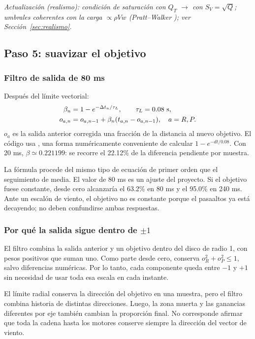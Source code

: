 \textit{Actualización (realismo): condición de saturación con $Q_T$ $\rightarrow$ con $S_V=\sqrt Q$; umbrales coherentes con la carga $\propto\rho Vw$ (Pratt--Walker \cite{pratt1954}); ver Sección~\ref{sec:realismo}.}

\subsection{Paso 5: suavizar el objetivo}
\subsubsection{Filtro de salida de 80 ms}
Después del límite vectorial:
\begin{align}
\beta_n&=1-e^{-\Delta t_n/\tau_L},\qquad \tau_L=0.08\ {\rm s},\\
o_{a,n}&=o_{a,n-1}+\beta_n(t_{a,n}-o_{a,n-1}),\quad a=R,P.
\label{eq:turb-lp}
\end{align}
$o_a$ es la salida anterior corregida una fracción de la distancia al nuevo objetivo. El código usa , una forma numéricamente conveniente de calcular $1-e^{-dt/0.08}$. Con 20 ms, $\beta\simeq0.221199$: se recorre el 22.12\% de la diferencia pendiente por muestra.

La fórmula procede del mismo tipo de ecuación de primer orden que el seguimiento de media. El valor de 80 ms es un ajuste del proyecto. Si el objetivo fuese constante, desde cero alcanzaría el 63.2\% en 80 ms y el 95.0\% en 240 ms. Ante un escalón de viento, el objetivo no es constante porque el pasaaltos ya está decayendo; no deben confundirse ambas respuestas.

\subsubsection{Por qué la salida sigue dentro de $\pm1$}
El filtro combina la salida anterior y un objetivo dentro del disco de radio 1, con pesos positivos que suman uno. Como parte desde cero, conserva $o_R^2+o_P^2\le1$, salvo diferencias numéricas. Por lo tanto, cada componente queda entre $-1$ y $+1$ sin necesidad de usar toda esa escala en cada instante.

El límite radial conserva la dirección del objetivo en una muestra, pero el filtro combina historia de distintas direcciones. Luego, la zona muerta y las ganancias diferentes por eje también cambian la proporción final. No corresponde afirmar que toda la cadena hasta los motores conserve siempre la dirección del vector de viento.

